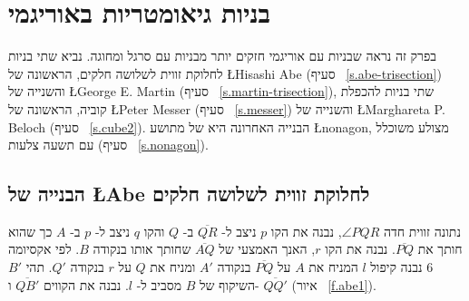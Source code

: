 

\chapter{בניות גיאומטריות באוריגמי}\label{c.origami-constructions}

בפרק זה נראה שבניות עם אוריגמי חזקים יותר מבניות עם סרגל ומחוגה. נביא שתי בניות לחלוקת זווית לשלושה חלקים, הראשונה של 
\L{Hisashi Abe}
(סעיף%
~\ref{s.abe-trisection})
והשנייה של
\L{George E. Martin}
(סעיף%
~\ref{s.martin-trisection}),
שתי בניות להכפלת קוביה, הראשונה של
\L{Peter Messer}
(סעיף%
~\ref{s.messer})
והשנייה של
\L{Marghareta P. Beloch}
(סעיף%
~\ref{s.cube2}).
הבנייה האחרונה היא של מתושע
\L{nonagon},
מצולע משוכלל עם תשעה צלעות (סעיף%
~\ref{s.nonagon}).

\section{הבנייה של 
\L{Abe}\label{s.abe-trisection}
לחלוקת זווית לשלושה חלקים%
}\label{s.trisection-abe}

נתונה זווית חדה
$\angle PQR$,
נבנה את הקו
$p$
ניצב ל-%
$\overline{QR}$
ב-%
$Q$
והקו
$q$
ניצב ל-%
$p$
ב-%
$A$
כך שהוא חותך את
$\overline{PQ}$.
נבנה את הקו
$r$,
האנך האמצעי של
$\overline{AQ}$
שחותך אותו בנקודה
$B$.
לפי אקסיומה 
$6$
נבנה קיפול
$l$
המניח את 
$A$
על
$\overline{PQ}$ 
בנקודה
$A'$
ומניח את
$Q$
על
$r$
בנקודה
$Q'$.
תהי
$B'$
השיקוף של 
$B$
מסביב ל-%
$l$.
נבנה את הקווים
$\overline{QB'}$
ו-%
$\overline{QQ'}$
(איור%
~\ref{f.abe1}).

